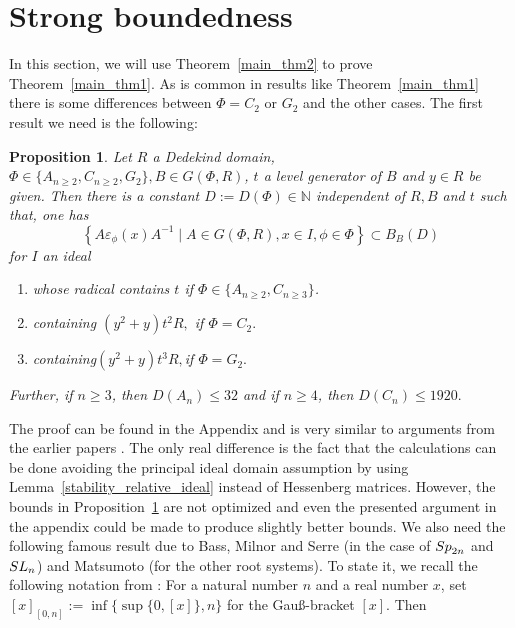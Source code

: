 \documentclass[12pt]{amsart}
\newtheorem{proposition}[theorem]{Proposition}
\theoremstyle{definition}\newtheorem{definition}[theorem]{Definition}
\theoremstyle{remark}\newtheorem{remark}[theorem]{Remark}
\theoremstyle{definition}\newtheorem{case}{Case}
\begin{document}
\section{Strong boundedness}\label{strong_bound_section}

In this section, we will use Theorem~\ref{main_thm2} to prove Theorem~\ref{main_thm1}. As is common in results like Theorem~\ref{main_thm1} there is some differences between $\Phi=C_2$ or $G_2$ and the other cases. The first result we need is the following:

\begin{proposition}\label{plucking_lemma}
Let $R$ a Dedekind domain, $\Phi\in\{A_{n\geq 2},C_{n\geq 2},G_2\}, B\in G(\Phi,R)$, $t$ a level generator of $B$ and $y\in R$ be given. 
Then there is a constant $D:=D(\Phi)\in\mathbb{N}$ independent of $R,B$ and $t$ such that, one has
\begin{equation}\label{root_element_inclusion}
\left\{A\varepsilon_{\phi}(x)A^{-1}\mid A\in G(\Phi,R),x\in I,\phi\in\Phi\right\}\subset B_B(D)
\end{equation}
for $I$ an ideal 
\begin{enumerate}
\item whose radical contains $t$ if $\Phi\in\{A_{n\geq 2},C_{n\geq 3}\}$.
\item containing $(y^2+y)t^2R,$ if $\Phi=C_2.$
\item containing$ (y^2+y)t^3R,$if $\Phi=G_2.$
\end{enumerate}
Further, if $n\geq 3$, then $D(A_n)\leq 32$ and if $n\geq 4$, then $D(C_n)\leq 1920.$
\end{proposition}

The proof can be found in the Appendix and is very similar to arguments from the earlier papers \cite{KLM,explicit_strong_bound_sp_2n,General_strong_bound}. The only real difference is the fact that the calculations can be done avoiding the principal ideal domain assumption by using Lemma~\ref{stability_relative_ideal} instead of Hessenberg matrices. However, the bounds in Proposition~\ref{plucking_lemma} are not optimized and even the presented argument in the appendix could be made to produce slightly better bounds.  We also need the following famous result due to Bass, Milnor and Serre (in the case of ${\rm Sp}_{2n}$ and ${\rm SL}_n$) and Matsumoto (for the other root systems). To state it, we recall the following notation from \cite{MR244257}: For a natural number $n$ and a real number $x$, set $[x]_{[0,n]}:=\inf\{\sup\{0,[x]\},n\}$ for the Gau{\ss}-bracket $[x].$ Then
\end{document}

